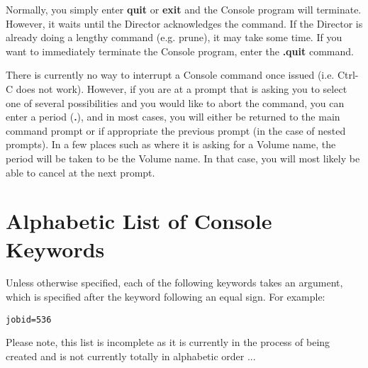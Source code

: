 Normally, you simply enter {\bf quit} or {\bf exit} and the Console program
will terminate. However, it waits until the Director acknowledges the command.
If the Director is already doing a lengthy command (e.g. prune), it may take
some time. If you want to immediately terminate the Console program, enter the
{\bf .quit} command.

There is currently no way to interrupt a Console command once issued (i.e.
Ctrl-C does not work). However, if you are at a prompt that is asking you to
select one of several possibilities and you would like to abort the command,
you can enter a period ({\bf .}), and in most cases, you will either be
returned to the main command prompt or if appropriate the previous prompt (in
the case of nested prompts). In a few places such as where it is asking for a
Volume name, the period will be taken to be the Volume name. In that case, you
will most likely be able to cancel at the next prompt.

\label{keywords}
\section{Alphabetic List of Console Keywords}
Unless otherwise specified, each of the following keywords
takes an argument, which is specified after the keyword following
an equal sign. For example:

\begin{verbatim}
jobid=536
\end{verbatim}

Please note, this list is incomplete as it is currently in
the process of being created and is not currently totally in
alphabetic
order ...

